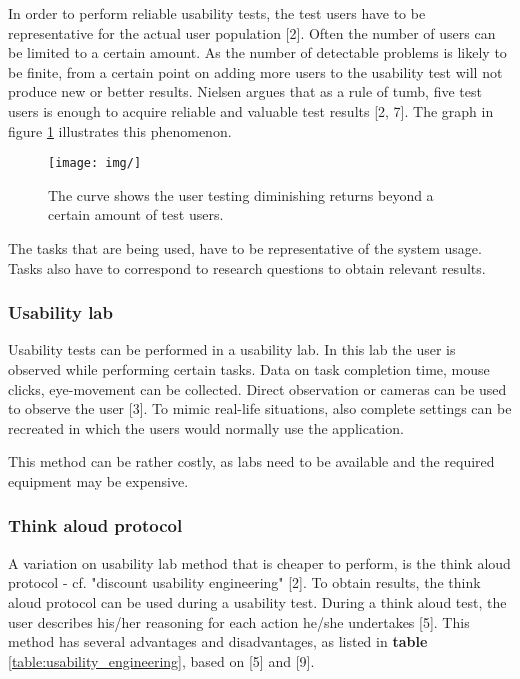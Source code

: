 In order to perform reliable usability tests, the test users have to be representative for the actual user population [2]. Often the number of users can be limited to a certain amount. As the number of detectable problems is likely to be finite, from a certain point on adding more users to the usability test will not produce new or better results. Nielsen argues that as a rule of tumb, five test users is enough to acquire reliable and valuable test results [2, 7]. The graph in figure \ref{figure:diminishing_returns} illustrates this phenomenon.

\begin{figure}%
	\begin{center}
		\texttt{[image: img/]}
		\caption{The curve shows the user testing diminishing returns beyond a certain amount of test users.}
		\label{figure:diminishing_returns}
	\end{center}
\end{figure}


The tasks that are being used, have to be representative of the system usage. Tasks also have to correspond to research questions to obtain relevant results.


\subsubsection{Usability lab}

Usability tests can be performed in a usability lab. In this lab the user is observed while performing certain tasks. Data on task completion time, mouse clicks, eye-movement can be collected. Direct observation or cameras can be used to observe the user [3]. To mimic real-life situations, also complete settings can be recreated in which the users would normally use the application.

This method can be rather costly, as labs need to be available and the required equipment may be expensive.


\subsubsection{Think aloud protocol}

A variation on usability lab method that is cheaper to perform, is the think aloud protocol - cf. "discount usability engineering" [2]. To obtain results, the think aloud protocol can be used during a usability test. During a think aloud test, the user describes his/her reasoning for each action he/she undertakes [5]. This method has several advantages and disadvantages, as listed in \textbf{table} \ref{table:usability_engineering}, based on [5] and [9].

